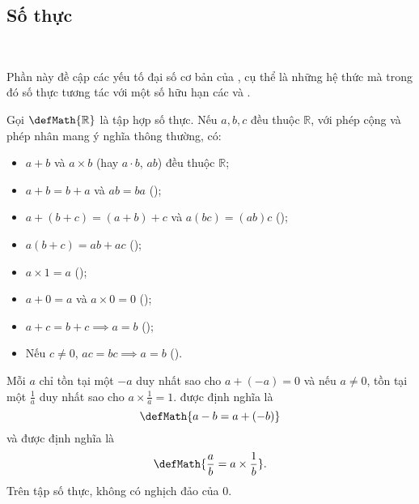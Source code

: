 \subsection{Số thực}

\ %

Phần này đề cập các yếu tố đại số cơ bản của , cụ thể là những hệ thức mà trong đó số thực tương tác với một số hữu hạn các  và . 

Gọi $\defMath{\mathbb{R}}$ là tập hợp số thực. Nếu $a, b, c$ đều thuộc $\mathbb{R}$, với phép cộng và phép nhân mang ý nghĩa thông thường, có:
\begin{itemize}
   \item $a + b$ và $a\times b$ (hay $a\cdot b$, $ab$) đều thuộc $\mathbb{R}$;
   \item $a+b=b+a$ và $ab=ba$ ();
   \item $a+(b+c)=(a+b)+c$ và $a(bc)=(ab)c$ ();
   \item $a(b+c)=ab+ac$ ();
   \item $a\times 1 = a$ ();
   \item $a + 0 = a$ và $a\times 0 = 0$ ();
   \item $a + c = b + c \implies a = b$ ();
   \item Nếu $c \neq 0$, $ac = bc \implies a = b$ ().
\end{itemize}

Mỗi $a$ chỉ tồn tại một  $-a$ duy nhất sao cho $a + (-a) = 0$ và nếu $a\neq 0$, tồn tại một  $\frac{1}{a}$ duy nhất sao cho $a\times \frac{1}{a} = 1$.  được định nghĩa là $$\defMath{a-b = a + (-b)}$$ và  được định nghĩa là $$\defMath{\frac{a}{b} = a\times \frac{1}{b}}.$$ Trên tập số thực, không có nghịch đảo của $0$.